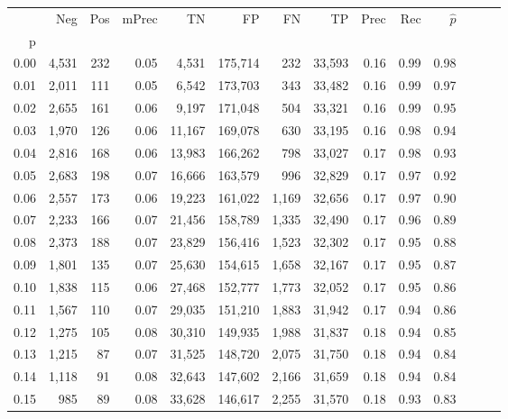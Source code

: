 \begin{tabular}{rrrrrrrrrrrrrr}
\toprule
{} &    Neg &  Pos & mPrec &       TN &       FP &      FN &      TP &  Prec &   Rec & $\hat{p}$ \\
p    &        &      &       &          &          &         &         &       &       &           \\
\midrule
0.00 &  4,531 &  232 &  0.05 &    4,531 &  175,714 &     232 &  33,593 &  0.16 &  0.99 &      0.98 \\
0.01 &  2,011 &  111 &  0.05 &    6,542 &  173,703 &     343 &  33,482 &  0.16 &  0.99 &      0.97 \\
0.02 &  2,655 &  161 &  0.06 &    9,197 &  171,048 &     504 &  33,321 &  0.16 &  0.99 &      0.95 \\
0.03 &  1,970 &  126 &  0.06 &   11,167 &  169,078 &     630 &  33,195 &  0.16 &  0.98 &      0.94 \\
0.04 &  2,816 &  168 &  0.06 &   13,983 &  166,262 &     798 &  33,027 &  0.17 &  0.98 &      0.93 \\
0.05 &  2,683 &  198 &  0.07 &   16,666 &  163,579 &     996 &  32,829 &  0.17 &  0.97 &      0.92 \\
0.06 &  2,557 &  173 &  0.06 &   19,223 &  161,022 &   1,169 &  32,656 &  0.17 &  0.97 &      0.90 \\
0.07 &  2,233 &  166 &  0.07 &   21,456 &  158,789 &   1,335 &  32,490 &  0.17 &  0.96 &      0.89 \\
0.08 &  2,373 &  188 &  0.07 &   23,829 &  156,416 &   1,523 &  32,302 &  0.17 &  0.95 &      0.88 \\
0.09 &  1,801 &  135 &  0.07 &   25,630 &  154,615 &   1,658 &  32,167 &  0.17 &  0.95 &      0.87 \\
0.10 &  1,838 &  115 &  0.06 &   27,468 &  152,777 &   1,773 &  32,052 &  0.17 &  0.95 &      0.86 \\
0.11 &  1,567 &  110 &  0.07 &   29,035 &  151,210 &   1,883 &  31,942 &  0.17 &  0.94 &      0.86 \\
0.12 &  1,275 &  105 &  0.08 &   30,310 &  149,935 &   1,988 &  31,837 &  0.18 &  0.94 &      0.85 \\
0.13 &  1,215 &   87 &  0.07 &   31,525 &  148,720 &   2,075 &  31,750 &  0.18 &  0.94 &      0.84 \\
0.14 &  1,118 &   91 &  0.08 &   32,643 &  147,602 &   2,166 &  31,659 &  0.18 &  0.94 &      0.84 \\
0.15 &    985 &   89 &  0.08 &   33,628 &  146,617 &   2,255 &  31,570 &  0.18 &  0.93 &      0.83 \\

\end{tabular}
